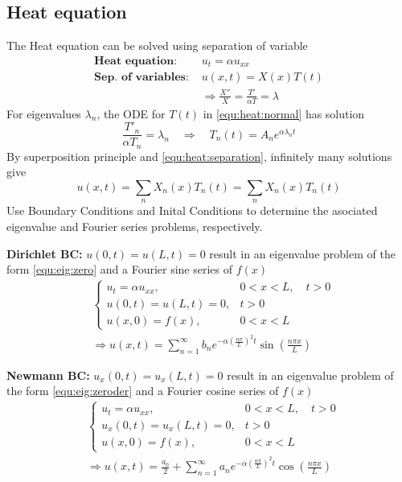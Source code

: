 \documentclass[10pt,leqno]{article}
\begin{document}
\begin{multicols}{2}
\subsection*{Heat equation}

The Heat equation can be solved using separation of variable
\begin{align}
    \textbf{Heat equation:\ }& u_{t}=\alpha u_{xx} \\
    \textbf{Sep. of variables:\ }& u(x,t)=X(x)T(t) \label{equ:heat:separation} \\
    & \Rightarrow \frac{X''}{X} = \frac{T'}{\alpha T} = \lambda \label{equ:heat:normal}
\end{align}
For eigenvalues $\lambda_{n}$, the ODE for $T(t)$ in \eqref{equ:heat:normal} has solution
\begin{equation}
\frac{T'_{n}}{\alpha T_{n}} = \lambda_{n} \quad \Rightarrow \quad T_{n}(t)=A_{n}e^{\alpha\lambda_{n}t}
\end{equation}
By superposition principle and \eqref{equ:heat:separation}, infinitely many solutions give
\begin{equation}
u(x,t)=\sum_{n} X_{n}(x)T_{n}(t) = \sum_{n} X_{n}(x)T_{n}(t)
\end{equation}
Use Boundary Conditions and Inital Conditions to determine the asociated eigenvalue and Fourier series problems, respectively.

\textbf{Dirichlet BC:} $u(0,t) = u(L,t)= 0$ result in an eigenvalue pro\-blem of the form \eqref{equ:eig:zero} and a Fourier sine series of $f(x)$
\begin{align}
    & \left\{ \begin{array}{ll}
            u_{t} = \alpha u_{xx}, & 0<x<L, \quad t>0 \\
            u(0,t) = u(L,t)= 0, & t>0 \\
            u(x,0) = f(x), & 0<x<L
    \end{array}\right. \label{equ:heat:dirichlet} \\
    & \Rightarrow u(x,t)=\sum_{n=1}^{\infty}b_{n}e^{-\alpha \left(\frac{n \pi}{L}\right)^{2}t}\sin\left(\frac{n\pi x}{L}\right)
\end{align}

\textbf{Newmann BC:} $u_{x}(0,t) = u_{x}(L,t)= 0$ result in an eigenvalue problem of the form \eqref{equ:eig:zeroder} and a Fourier cosine series of $f(x)$
\begin{align}
    & \left\{ \begin{array}{ll}
            u_{t} = \alpha u_{xx}, & 0<x<L, \quad t>0 \\
            u_{x}(0,t) = u_{x}(L,t)= 0, & t>0 \\
            u(x,0) = f(x), & 0<x<L
    \end{array}\right. \label{equ:heat:neuman}\\
    & \Rightarrow u(x,t)= \frac{a_{0}}{2}+\sum_{n=1}^{\infty}a_{n}e^{-\alpha \left(\frac{n \pi}{L}\right)^{2}t}\cos\left(\frac{n\pi x}{L}\right)
\end{align}


\end{multicols}
\end{document}
